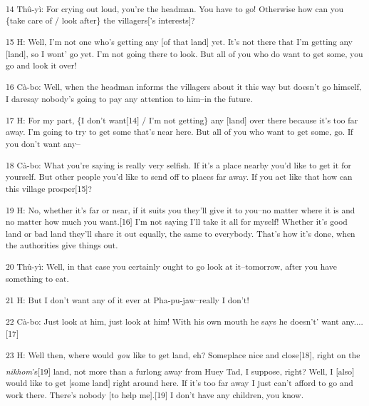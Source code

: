 {\textsuperscript{14 Thû-yì: For crying out loud, you're the headman.
You have to go! Otherwise how can you \{take care of / look after\} the villagers['s
interests]?}}

{\textsuperscript{15 H: Well, I'm not one who's getting any [of that land]
yet. It's not there that I'm getting any [land], so I wont' go yet. I'm not going
there to look. But all of you who do want to get some, you go and look it over!
}}

{\textsuperscript{16 Cà-bo: Well, when the headman informs the villagers
about it this way but doesn't go himself, I daresay nobody's going to pay any attention
to him--in the future. }}

{\textsuperscript{17 H: For my part, \{I don't want[14] / I'm not getting\}
any [land] over there because it's too far away. I'm going to try to get some that's
near here. But all of you who want to get some, go. If you don't want any--}}

{\textsuperscript{18 Cà-bo: What you're saying is really very selfish.
If it's a place nearby you'd like to get it for yourself. But other people you'd
like to send off to places far away. If you act like that how can this village
prosper[15]?}}

{\textsuperscript{19 H: No, whether it's far or near, if it suits you they'll
give it to you--no matter where it is and no matter how much you want.[16] I'm
not saying I'll take it all for myself! Whether it's good land or bad land they'll
share it out equally, the same to everybody. That's how it's done, when the authorities
give things out. }}

{\textsuperscript{20 Thû-yì: Well, in that case you certainly ought to
go look at it--tomorrow, after you have something to eat.}}

{\textsuperscript{21 H: But I don't want any of it ever at Pha-pu-jaw--really
I don't!}}

{\textsuperscript{22 Cà-bo: Just look at him, just look at him! With his
own mouth he says he doesn't' want any....[17]}}

{\textsuperscript{23 H: Well then, where would }}{\textsuperscript{\textit{you}}}{\textsuperscript{
like to get land, eh? Someplace nice and close[18], right on the }}{\textsuperscript{\textit{nikhom}}}{\textsuperscript{'s[19]
land, not more than a furlong away from Huey Tad, I suppose, right? Well, I [also]
would like to get [some land] right around here. If it's too far away I just can't
afford to go and work there. There's nobody [to help me].[19] I don't have any
children, you know.}}

